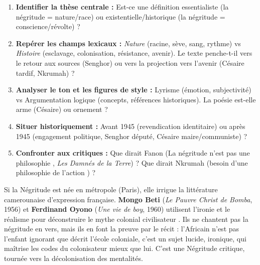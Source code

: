 \documentclass[11pt]{article}
\newcommand{\cle}[1]{{\popxbold\color{popdark}#1}}
\begin{document}
\begin{methode}
\begin{enumerate}
    \item \textbf{Identifier la thèse centrale :} Est-ce une définition essentialiste (la négritude = nature/race) ou existentielle/historique (la négritude = conscience/révolte) ?
    \item \textbf{Repérer les champs lexicaux :} \emph{Nature} (racine, sève, sang, rythme) vs \emph{Histoire} (esclavage, colonisation, résistance, avenir). Le texte penche-t-il vers le \guillemotleft retour aux sources \guillemotright (Senghor) ou vers la \guillemotleft projection vers l'avenir \guillemotright (Césaire tardif, Nkrumah) ?
    \item \textbf{Analyser le ton et les figures de style :} Lyrisme (émotion, subjectivité) vs Argumentation logique (concepts, références historiques). La poésie est-elle \guillemotleft arme \guillemotright (Césaire) ou \guillemotleft ornement \guillemotright ?
    \item \textbf{Situer historiquement :} Avant 1945 (revendication identitaire) ou après 1945 (engagement politique, Senghor député, Césaire maire/communiste) ?
    \item \textbf{Confronter aux critiques :} Que dirait Fanon (\guillemotleft La négritude n'est pas une philosophie \guillemotright, \emph{Les Damnés de la Terre}) ? Que dirait Nkrumah (besoin d'une \guillemotleft philosophie de l'action \guillemotright) ?
\end{enumerate}
\end{methode}

\begin{exemplebox}
Si la Négritude est née en métropole (Paris), elle irrigue la littérature camerounaise d'expression française. \textbf{Mongo Beti} (\emph{Le Pauvre Christ de Bomba}, 1956) et \textbf{Ferdinand Oyono} (\emph{Une vie de boy}, 1960) utilisent l'ironie et le réalisme pour déconstruire le mythe colonial \guillemotleft civilisateur \guillemotright. Ils ne chantent pas la \guillemotleft négritude \guillemotright en vers, mais ils en font la \guillemotleft preuve par le récit \guillemotright : l'Africain n'est pas l'enfant ignorant que décrit l'école coloniale, c'est un sujet lucide, ironique, qui maîtrise les codes du colonisateur mieux que lui. C'est une \cle{Négritude critique}, tournée vers la décolonisation des mentalités.
\end{exemplebox}
\end{document}
